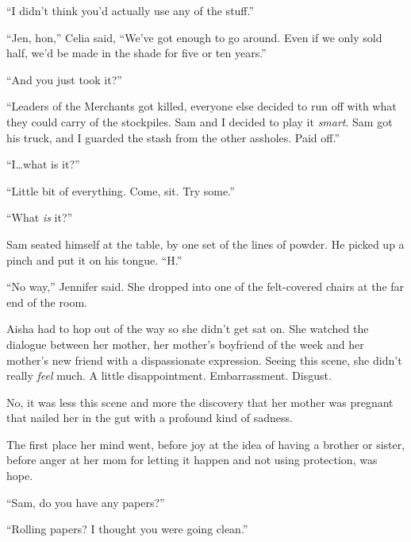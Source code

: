 ``I didn't think you'd actually use any of the stuff.''



``Jen, hon,'' Celia said, ``We've got enough to go around.  Even if we only sold half, we'd be made in the shade for five or ten years.''



``And you just took it?''



``Leaders of the Merchants got killed, everyone else decided to run off with what they could carry of the stockpiles.  Sam and I decided to play it \emph{smart}.  Sam got his truck, and I guarded the stash from the other assholes.  Paid off.''



``I\ldots what is it?''



``Little bit of everything.  Come, sit.  Try some.''



``What \emph{is} it?''



Sam seated himself at the table, by one set of the lines of powder.  He picked up a pinch and put it on his tongue.  ``H.''



``No way,'' Jennifer said.  She dropped into one of the felt-covered chairs at the far end of the room.



Aisha had to hop out of the way so she didn't get sat on.  She watched the dialogue between her mother, her mother's boyfriend of the week and her mother's new friend with a dispassionate expression.  Seeing this scene, she didn't really \emph{feel} much.  A little disappointment.  Embarrassment.  Disgust.



No, it was less this scene and more the discovery that her mother was pregnant that nailed her in the gut with a profound kind of sadness.



The first place her mind went, before joy at the idea of having a brother or sister, before anger at her mom for letting it happen and not using protection, was hope.



``Sam, do you have any papers?''



``Rolling papers?  I thought you were going clean.''




